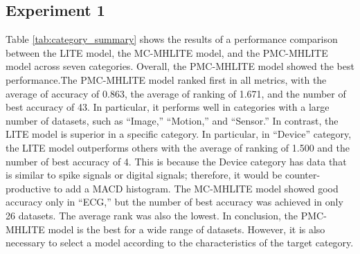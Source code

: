 \documentclass[conference]{IEEEtran}
\begin{document}
\subsection{Experiment 1}

Table \ref{tab:category_summary} shows the results of a performance comparison between the LITE model, the MC-MHLITE model, and the PMC-MHLITE model across seven categories.
Overall, the PMC-MHLITE model showed the best performance.The PMC-MHLITE model ranked first in all metrics, with the average of accuracy of 0.863, the average of ranking of 1.671, and the number of best accuracy of 43.  In particular, it performs well in categories with a large number of datasets, such as ``Image,'' ``Motion,'' and ``Sensor.'' In contrast, the LITE model is superior in a specific category. In particular, in ``Device'' category, the LITE model outperforms others with the average of ranking of 1.500 and the number of best accuracy of 4. This is because the Device category has data that is similar to spike signals or digital signals; therefore, it would be counter-productive to add a MACD histogram. The MC-MHLITE model showed good accuracy only in ``ECG,'' but the number of best accuracy was achieved in only 26 datasets. The average rank was also the lowest. In conclusion, the PMC-MHLITE model is the best for a wide range of datasets. However, it is also necessary to select a model according to the characteristics of the target category.

%
%
\end{document}
